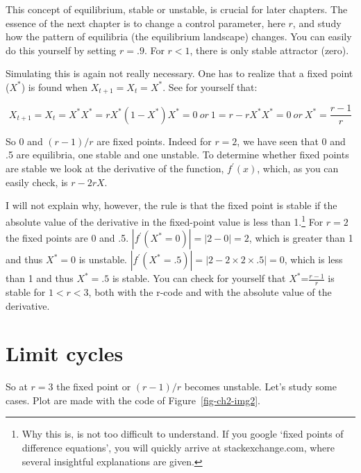 \documentclass[
  letterpaper,
]{scrbook}
\begin{document}
This concept of equilibrium, stable or unstable, is crucial for later
chapters. The essence of the next chapter is to change a control
parameter, here \(r\), and study how the pattern of equilibria (the
equilibrium landscape) changes. You can easily do this yourself by
setting \(r = .9\). For \(r < 1\), there is only stable attractor
(zero).

Simulating this is again not really necessary. One has to realize that a
fixed point (\(X^{*}\)) is found when \(X_{t + 1} = X_{t} = X^{*}\). See
for yourself that:

\[{X_{t + 1} = X_{t} = X^{*}
}{X^{*} = rX^{*}\left( 1 - X^{*} \right)
}{X^{*} = 0\ or\ 1 = r - rX^{*}
}{X^{*} = 0\ or\ X^{*} = \frac{r - 1}{r}}\]

So 0 and \((r - 1)/r\) are fixed points. Indeed for \(r = 2\), we have
seen that 0 and .5 are equilibria, one stable and one unstable. To
determine whether fixed points are stable we look at the derivative of
the function, \(f^{'}(x)\), which, as you can easily check, is
\(r - 2rX\).

I will not explain why, however, the rule is that the fixed point is
stable if the absolute value of the derivative in the fixed-point value
is less than 1.\footnote{Why this is, is not too difficult to
  understand. If you google `fixed points of difference equations', you
  will quickly arrive at stackexchange.com, where several insightful
  explanations are given.} For \(r = 2\) the fixed points are 0 and .5.
\(\left| f^{'}\left( X^{*} = 0 \right) \right| = |2 - 0| = 2\), which is
greater than 1 and thus \(X^{*} = 0\) is unstable.
\(\left| f^{'}\left( X^{*} = .5 \right) \right| = |2 - 2 \times 2 \times .5| = 0\),
which is less than 1 and thus \(X^{*} = .5\) is stable. You can check
for yourself that \(X^{*}\)=\(\frac{r - 1}{r}\) is stable for
\(1 < r < 3\), both with the r-code and with the absolute value of the
derivative.

\hypertarget{limit-cycles}{%
\section{Limit cycles}\label{limit-cycles}}

So at \(r = 3\) the fixed point or \((r - 1)/r\) becomes unstable. Let's
study some cases. Plot are made with the code of
Figure~\ref{fig-ch2-img2}.
\end{document}
